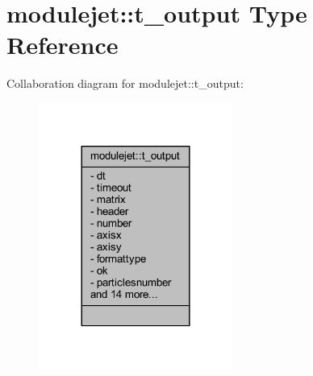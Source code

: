 \hypertarget{structmodulejet_1_1t__output}{}\section{modulejet\+:\+:t\+\_\+output Type Reference}
\label{structmodulejet_1_1t__output}


Collaboration diagram for modulejet\+:\+:t\+\_\+output\+:\nopagebreak
\begin{figure}[H]
\begin{center}
\leavevmode
\includegraphics[width=180pt]{structmodulejet_1_1t__output__coll__graph}
\end{center}
\end{figure}
